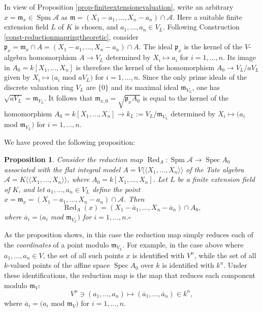 \documentclass[a4paper,12pt, dvipdfmx]{jsbook}
\def\m{\mathfrak{m}}
\def\ovl#1{\overline{#1}}%
\def\Red{\mathop{\mathrm{Red}}\nolimits}
\def\Spec{\mathop{\mathrm{Spec}}\nolimits}
\def\Spm{\mathop{\mathrm{Spm}}\nolimits}
\def\dl{\langle\!\langle}
\def\dr{\rangle\!\rangle}
\theoremstyle{plain}
\newtheorem{prop}[thm]{\bfseries Proposition}
\theoremstyle{definition}
\begin{document}
In view of Proposition \ref{prop-finiteextensionevaluation}, write an arbitrary $x=\m_x\in\Spm\mathcal{A}$ as $\m=(X_1-a_1,\ldots,X_n-a_n)\cap\mathcal{A}$.
Here a suitable finite extension field $L$ of $K$ is chosen, and $a_1,\ldots,a_n\in V_L$.
Following Construction \ref{const-reductionmapringtheoretic}, consider $\mathfrak{p}_x=\m_x\cap A=(X_1-a_1,\ldots,X_n-a_n)\cap A$.
The ideal $\mathfrak{p}_x$ is the kernel of the $V$-algebra homomorphism $A\rightarrow V_L$ determined by $X_i\mapsto a_i$ for $i=1,\ldots,n$.
Its image in $A_0=k[X_1,\ldots,X_n]$ is therefore the kernel of the homomorphism $A_0\rightarrow V_L/aV_L$ given by $X_i\mapsto (a_i$ mod $aV_L)$ for $i=1,\ldots,n$.
Since the only prime ideals of the discrete valuation ring $V_L$ are $\{0\}$ and its maximal ideal $\m_{V_L}$, one has $\sqrt{aV_L}=\m_{V_L}$.
It follows that $\m_{x,0}=\sqrt{\mathfrak{p}_xA_0}$ is equal to the kernel of the homomorphism $A_0=k[X_1,\ldots,X_n]\rightarrow k_L:=V_L/\m_{V_L}$ determined by $X_i\mapsto (a_i$ mod $\m_{V_L})$ for $i=1,\ldots,n$.

We have proved the following proposition:
\begin{prop}\label{prop-reductionmapcalcuation}{\rm 
Consider the reduction map $\Red_A\colon\Spm\mathcal{A}\rightarrow\Spec A_0$ associated with the flat integral model $A=V\dl X_1,\ldots,X_n\dr$ of the Tate algebra $\mathcal{A}=K\dl X_1,\ldots,X_n\dr$, where $A_0=k[X_1,\ldots,X_n]$.
Let $L$ be a finite extension field of $K$, and let $a_1,\ldots,a_n\in V_L$ define the point $x=\m_x=(X_1-a_1,\ldots,X_n-a_n)\cap\mathcal{A}$.
Then
$$
\Red_A(x)=(X_1-\ovl{a}_1,\ldots,X_n-\ovl{a}_n)\cap A_0,
$$
where $\ovl{a}_i=(a_i$ mod $\m_{V_L})$ for $i=1,\ldots,n$.}\hfill$\square$
\end{prop}

As the proposition shows, in this case the reduction map simply reduces each of the {\it coordinates} of a point modulo $\m_{V_L}$.
For example, in the case above where $a_1,\ldots,a_n\in V$, the set of all such points $x$ is identified with $V^n$, while the set of all $k$-valued points of the affine space $\Spec A_0$ over $k$ is identified with $k^n$. Under these identifications, the reduction map is the map that reduces each component modulo $\m_V$:
$$
V^n\ni(a_1,\ldots,a_n)\longmapsto(\ovl{a}_1,\ldots,\ovl{a}_n)\in k^n,
$$
where $\ovl{a}_i=(a_i$ mod $\m_V)$ for $i=1,\ldots,n$.
\end{document}
